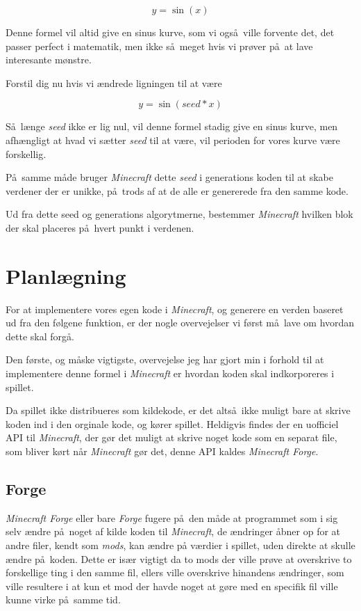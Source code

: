 \documentclass[a4paper,12pt]{report}
\begin{document}
		\[y = \sin (x)\]

		Denne formel vil altid give en sinus kurve, som vi ogs\aa \ ville forvente det, det passer perfect i matematik, men ikke s\aa \ meget
		hvis vi pr\o ver p\aa \ at lave interesante m\o nstre.

		Forstil dig nu hvis vi \ae ndrede ligningen til at være

		\[y = \sin (seed * x)\]

		S\aa \ l\ae nge \emph{seed} ikke er lig nul, vil denne formel stadig give en sinus kurve, men afh\ae ngligt at hvad vi s\ae tter \emph{seed}
		til at v\ae re, vil perioden for vores kurve v\ae re forskellig.

		P\aa \ samme m\aa de bruger \emph{Minecraft} dette \emph{seed} i generations koden til at skabe verdener der er unikke, p\aa \ trods
		af at de alle er genererede fra den samme kode.

		Ud fra dette seed og generations algorytmerne, bestemmer \emph{Minecraft} hvilken blok der skal placeres p\aa \ hvert punkt
		i verdenen.
	\section{Planlægning}
		For at implementere vores egen kode i \emph{Minecraft}, og generere en verden baseret ud fra den f\o lgene funktion, er der
		nogle overvejelser vi f\o rst m\aa \ lave om hvordan dette skal forg\aa .

		

		Den f\o rste, og m\aa ske vigtigste, overvejelse jeg har gjort min i forhold til at implementere denne formel i \emph{Minecraft}
		er hvordan koden skal indkorporeres i spillet.

		Da spillet ikke distribueres som kildekode, er det alts\aa \ ikke muligt bare at skrive koden ind i den orginale kode, og k\o rer spillet.
		Heldigvis findes der en uofficiel API til \emph{Minecraft}, der g\o r det muligt at skrive noget kode som en separat file, som bliver k\o rt
		n\aa r \emph{Minecraft} g\o r det, denne API kaldes \emph{Minecraft Forge}.

		\subsection{Forge}
		\emph{Minecraft Forge} eller bare \emph{Forge} fugere p\aa \ den m\aa de at programmet som i sig selv \ae ndre p\aa \ noget af
		kilde koden til \emph{Minecraft}, de \ae ndringer \aa bner op for at andre filer, kendt som \emph{mods}, kan \ae ndre p\aa
		v\ae rdier i spillet, uden direkte at skulle \ae ndre p\aa \ koden. Dette er is\ae r vigtigt da to mods der ville pr\o ve at overskrive
		to forskellige ting i den samme fil, ellers ville overskrive hinandens \ae ndringer, som ville resultere i at kun et mod der havde noget
		at g\o re med en specifik fil ville kunne virke p\aa \ samme tid.
\end{document}
